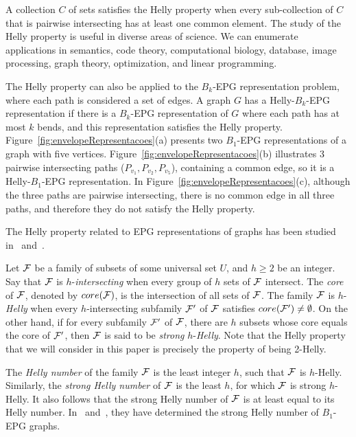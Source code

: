 \documentclass[12pt]{article}
\begin{document}
A  collection $C$ of sets satisfies the Helly property when every sub-collection of $C$ that is pairwise intersecting has at least one common element. 
The study of the Helly property is useful in diverse areas of science. We can enumerate applications in semantics, code theory, computational biology, database, image processing, graph theory, optimization, and linear programming.

The Helly property can also be applied to the $B_k$-EPG representation problem, where each path is considered a set of edges. A graph $G$ has a  Helly-$B_k$-EPG representation if there is a $B_k$-EPG representation of $G$ where each path has at most $k$ bends, and this representation satisfies the Helly property. Figure~\ref{fig:envelopeRepresentacoes}(a) presents two $B_1$-EPG representations of a graph with five vertices.  Figure~\ref{fig:envelopeRepresentacoes}(b)   illustrates 3 pairwise intersecting paths ($P_{v_1}, P_{v_2}, P_{v_5}$), containing a common edge, so it is a Helly-$B_1$-EPG representation. In Figure~\ref{fig:envelopeRepresentacoes}(c), although the three paths are pairwise intersecting, there is no common edge in all three paths, and therefore they do not satisfy the Helly property.

The Helly property related to EPG representations of graphs has been studied in~\cite{golumbic2009} and~\cite{golumbic2013}. 

Let $\cal {F}$ be a family of subsets of some universal set $U$, and $h\geq 2$ be an integer.  Say that $\cal{F}$ is $h$-{\it intersecting} when every group of $h$ sets of $\cal {F}$ intersect. The {\it core} of $\cal {F}$, denoted by $core(\cal F)$, is the intersection of all sets of $\cal {F}$. The family $\cal{F}$ is $h$-{\it Helly} when every $h$-intersecting subfamily $\cal{F'}$ of $\cal{F}$ satisfies $core(\cal{F'}) \neq \emptyset$. On the other hand, if for every subfamily $\cal{F'}$ of $\cal{F}$, there are $h$ subsets whose core equals the core of  $\cal {F'}$, then $\cal {F}$ is said to be {\it strong} $h$-{\it Helly}.
Note that the Helly property that we will consider in this paper is precisely the property of being 2-Helly. 

The  {\it Helly number} of the family $\cal{F}$ is the least integer $h$, such that $\cal{F}$ is $h$-Helly. Similarly, the {\it strong Helly number} of $\cal{F}$ is the least $h$, for which  $\cal{F}$ is strong $h$-Helly. It also follows that the strong Helly number of $\cal{F}$ is at least equal to its Helly number. In~\cite{golumbic2009} and~\cite{golumbic2013}, they have determined the strong Helly number of $B_1$-EPG graphs. 
\end{document}
